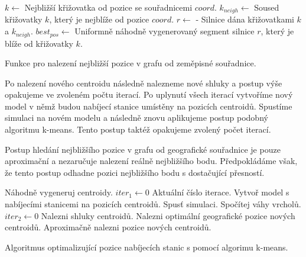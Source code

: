 \begin{algorithm}
\begin{algorithmic}
    \State $k \gets$ Nejbližší křižovatka od pozice se souřadnicemi $coord$.
    \State $k_{neigh} \gets$ Soused křižovatky $k$, který je nejblíže od pozice $coord$.
    \State $r \gets$ - Silnice dána křižovatkami $k$ a $k_{neigh}$.
    \State $best_{pos} \gets$ Uniformně náhodně vygenerovaný segment silnice $r$,
    který je blíže od křižovatky $k$.
\EndFunction
\end{algorithmic}
\caption{Funkce pro nalezení nejbližší pozice v grafu od zeměpisné souřadnice.}
\label{alg:find_closest_position}
\end{algorithm}

Po nalezení nového centroidu následně nalezneme nové shluky a postup výše 
opakujeme ve zvoleném počtu iterací. Po uplynutí všech iterací vytvoříme nový model
v němž budou nabíjecí stanice umístěny na pozicích centroidů. Spustíme simulaci
na novém modelu a následně znovu aplikujeme postup podobný algoritmu k-means.
Tento postup taktéž opakujeme zvolený počet iterací.

Postup hledání nejbližšího pozice v grafu od geografické souřadnice je pouze
aproximační a nezaručuje nalezení reálně nejbližšího bodu. Předpokládáme však, 
že tento postup odhadne pozici nejbližšího bodu s dostačující přesností.

\begin{algorithm}
\begin{algorithmic}
    \State Náhodně vygeneruj centroidy.
    \State $iter_1 \gets 0$   \Comment Aktuální číslo iterace. 
        \State Vytvoř model s nabíjecími stanicemi na pozicích centroidů.
        \State Spusť simulaci.
        \State Spočítej váhy vrcholů.
        \State $iter_2 \gets 0$
            \State Nalezni shluky centroidů.
            \State Nalezni optimální geografické pozice nových centroidů.
            \State Aproximačně nalezni pozice nových centroidů.
        \EndWhile
    \EndWhile
\EndFunction
\end{algorithmic}
\caption{Algoritmus optimalizující pozice nabíjecích stanic s pomocí algorimu k-means.}
\label{alg:kmeans}
\end{algorithm}